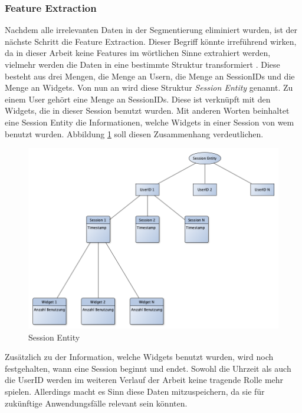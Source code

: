 \subsubsection{Feature Extraction}
	\label{ssub:Feature_extraction}
Nachdem alle irrelevanten Daten in der Segmentierung eliminiert wurden, ist der nächste Schritt die Feature Extraction. Dieser Begriff könnte irreführend wirken, da in dieser Arbeit keine Features im wörtlichen Sinne extrahiert werden, vielmehr werden die Daten in eine bestimmte Struktur transformiert \citep{BeKe19}. Diese besteht aus drei Mengen, die Menge an Usern, die Menge an SessionIDs und die Menge an Widgets. Von nun an wird diese Struktur \textit{Session Entity} genannt. Zu einem User gehört eine Menge an SessionIDs. Diese ist verknüpft mit den Widgets, die in dieser Session benutzt wurden. Mit anderen Worten beinhaltet eine Session Entity die Informationen, welche Widgets in einer Session von wem benutzt wurden. Abbildung \ref{fig:session-entity} soll diesen Zusammenhang verdeutlichen.\\
\begin{figure}[htb]
\begin{center}
	\includegraphics[width=\textwidth]{bilder/session-entity.png}
\end{center}
\caption{Session Entity}
\label{fig:session-entity}
\end{figure}

Zusätzlich zu der Information, welche Widgets benutzt wurden, wird noch festgehalten, wann eine Session beginnt und endet. Sowohl die Uhrzeit als auch die UserID werden im weiteren Verlauf der Arbeit keine tragende Rolle mehr spielen. Allerdings macht es Sinn diese Daten mitzuspeichern, da sie für zukünftige Anwendungsfälle relevant sein könnten.

